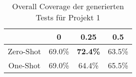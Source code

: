 \bgroup
\def\arraystretch{2}
\begin{table}[H]
	\vspace{.5cm}
	\centering		
	\begin{center}
		\begin{tabular}{|c||c|c|c|}
			\hline 
			& 0 & 0.25 & 0.5 \\
			\hline 
			\hline
			Zero-Shot & 69.0\% & \textbf{72.4\%} & 63.5\% \\
			\hline
			One-Shot & 69.0\% & 64.4\% & 65.5\% \\
			\hline
		\end{tabular} 
	\end{center}
	\caption{Overall Coverage der generierten Tests für Projekt 1}
	\label{fig:o-1}
	\vspace{-.8cm}
\end{table}
\egroup